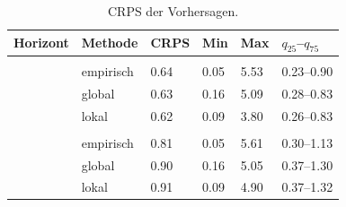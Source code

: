 \begin{table}[!h]
\caption{CRPS der Vorhersagen.}
\centering
{}
\begin{tabularx}{0.9\textwidth}{L L R R R R}
\toprule
Horizont & Methode & CRPS & Min & Max & $q_{25}$--$q_{75}$\\
\midrule
\addlinespace[0.3em]
\\
& empirisch & 0.64 & 0.05 & 5.53 & 0.23--0.90\\
& global & 0.63 & 0.16 & 5.09 & 0.28--0.83\\
& lokal & 0.62 & 0.09 & 3.80 & 0.26--0.83\\
\addlinespace[0.3em]
\\
& empirisch & 0.81 & 0.05 & 5.61 & 0.30--1.13\\
& global & 0.90 & 0.16 & 5.05 & 0.37--1.30\\
& lokal & 0.91 & 0.09 & 4.90 & 0.37--1.32\\
\bottomrule
\end{tabularx}
\label{tab:crps}
\end{table}
